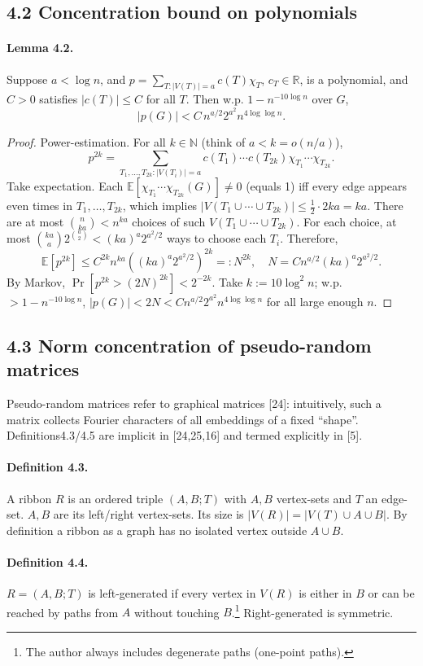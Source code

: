 \subsection*{4.2 Concentration bound on polynomials}
\paragraph{Lemma 4.2.} Suppose $a<\log n$, and $p=\sum_{T:|V(T)|=a}c(T)\chi_T$, $c_T\in\mathbb R$, is a polynomial, and $C>0$ satisfies $|c(T)|\le C$ for all $T$. Then w.p. $1-n^{-10\log n}$ over $G$,
\[|p(G)|<C\,n^{a/2}2^{a^2}n^{4\log\log n}.\tag{4.4}\]
\begin{proof}Power-estimation. For all $k\in\mathbb N$ (think of $a<k=o(n/a)$),
\[p^{2k}=\sum_{T_1,\ldots,T_{2k}:|V(T_i)|=a}c(T_1)\cdots c(T_{2k})\chi_{T_1}\cdots\chi_{T_{2k}}.\tag{4.5}\]
Take expectation. Each $\mathbb E[\chi_{T_1}\cdots\chi_{T_{2k}}(G)]\ne0$ (equals 1) iff every edge appears even times in $T_1,\ldots,T_{2k}$, which implies $|V(T_1\cup\cdots\cup T_{2k})|\le\frac12\cdot2ka=ka$. There are at most $\binom n{ka}<n^{ka}$ choices of such $V(T_1\cup\cdots\cup T_{2k})$. For each choice, at most $\binom{ka}a2^{\binom a2}<(ka)^a2^{a^2/2}$ ways to choose each $T_i$. Therefore,
\[\mathbb E[p^{2k}]\le C^{2k}n^{ka}((ka)^a2^{a^2/2})^{2k}=:N^{2k},\quad N=Cn^{a/2}(ka)^a2^{a^2/2}.\]
By Markov, $\Pr[p^{2k}>(2N)^{2k}]<2^{-2k}$. Take $k:=10\log^2n$; w.p. $>1-n^{-10\log n}$, $|p(G)|<2N<Cn^{a/2}2^{a^2}n^{4\log\log n}$ for all large enough $n$.\end{proof}
\subsection*{4.3 Norm concentration of pseudo-random matrices}
Pseudo-random matrices refer to graphical matrices [24]: intuitively, such a matrix collects Fourier characters of all embeddings of a fixed ``shape''. Definitions4.3/4.5 are implicit in [24,25,16] and termed explicitly in [5].
\paragraph{Definition 4.3.} A ribbon $R$ is an ordered triple $(A,B;T)$ with $A,B$ vertex-sets and $T$ an edge-set. $A,B$ are its left/right vertex-sets. Its size is $|V(R)|=|V(T)\cup A\cup B|$. By definition a ribbon as a graph has no isolated vertex outside $A\cup B$.
\paragraph{Definition 4.4.} $R=(A,B;T)$ is left-generated if every vertex in $V(R)$ is either in $B$ or can be reached by paths from $A$ without touching $B$.\footnote{The author always includes degenerate paths (one-point paths).} Right-generated is symmetric.
